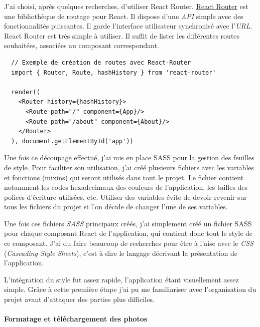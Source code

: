 \documentclass[12pt,a4paper]{article}
\begin{document}
  \bigskip

  J'ai choisi, après quelques recherches, d'utiliser React Router.
  \href{https://github.com/ReactTraining/react-router}{React Router} est
  une bibliothèque de routage pour React. Il dispose d'une \emph{API}
  simple avec des fonctionnalités puissantes. Il garde l'interface
  utilisateur synchronisé avec l'\emph{URL}. React Router est très simple
  à utiliser. Il suffit de lister les différentes routes souhaitées,
  associées au composant correspondant.

  \begin{verbatim}
  // Exemple de création de routes avec React-Router
  import { Router, Route, hashHistory } from 'react-router'

  render((
    <Router history={hashHistory}>
      <Route path="/" component={App}/>
      <Route path="/about" component={About}/>
    </Router>
  ), document.getElementById('app'))
  \end{verbatim}

  \bigskip

  Une fois ce découpage effectué, j'ai mis en place SASS pour la gestion
  des feuilles de style. Pour faciliter son utilisation, j'ai créé
  plusieurs fichiers avec les variables et fonctions (mixins) qui seront
  utilisés dans tout le projet. Le fichier contient notamment les codes
  hexadecimaux des couleurs de l'application, les tailles des polices
  d'écriture utilisées, etc. Utiliser des variables évite de devoir
  revenir sur tous les fichiers du projet si l'on décide de changer l'une
  de ses variables.

  \bigskip

  Une fois ces fichiers \emph{SASS} principaux créés, j'ai simplement créé
  un fichier SASS pour chaque composant React de l'application, qui
  contient donc tout le style de ce composant. J'ai du faire beaucoup de
  recherches pour être à l'aise avec le \emph{CSS} (\emph{Cascading Style
  Sheets}), c'est à dire le langage décrivant la présentation de
  l'application.

  \bigskip

  L'intégration du style fut assez rapide, l'application étant
  visuellement assez simple. Grâce à cette première étape j'ai pu me
  familiariser avec l'organisation du projet avant d'attaquer des parties
  plus difficiles.

  \bigskip

  \paragraph{Formatage et téléchargement des
  photos}\label{formatage-et-tuxe9luxe9chargement-des-photos}
\end{document}
